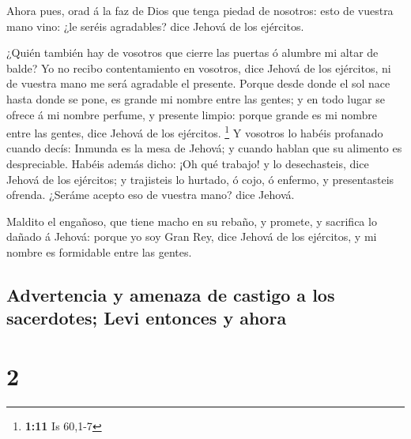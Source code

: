  Ahora pues, orad á la faz de Dios que tenga piedad de
nosotros: esto de vuestra mano vino: ¿le seréis agradables? dice Jehová
de los ejércitos.

 ¿Quién también hay de vosotros que cierre las puertas ó
alumbre mi altar de balde? Yo no recibo contentamiento en vosotros, dice
Jehová de los ejércitos, ni de vuestra mano me será agradable el
presente.  Porque desde donde el sol nace hasta donde se
pone, es grande mi nombre entre las gentes; y en todo lugar se ofrece á
mi nombre perfume, y presente limpio: porque grande es mi nombre entre
las gentes, dice Jehová de los ejércitos. \footnote{\textbf{1:11} Is
  60,1-7}  Y vosotros lo habéis profanado cuando decís:
Inmunda es la mesa de Jehová; y cuando hablan que su alimento es
despreciable.  Habéis además dicho: ¡Oh qué trabajo! y lo
desechasteis, dice Jehová de los ejércitos; y trajisteis lo hurtado, ó
cojo, ó enfermo, y presentasteis ofrenda. ¿Seráme acepto eso de vuestra
mano? dice Jehová.

 Maldito el engañoso, que tiene macho en su rebaño, y
promete, y sacrifica lo dañado á Jehová: porque yo soy Gran Rey, dice
Jehová de los ejércitos, y mi nombre es formidable entre las gentes.

\hypertarget{advertencia-y-amenaza-de-castigo-a-los-sacerdotes-levi-entonces-y-ahora}{%
\subsection{Advertencia y amenaza de castigo a los sacerdotes; Levi
entonces y
ahora}\label{advertencia-y-amenaza-de-castigo-a-los-sacerdotes-levi-entonces-y-ahora}}

\hypertarget{section-1}{%
\section{2}\label{section-1}}

